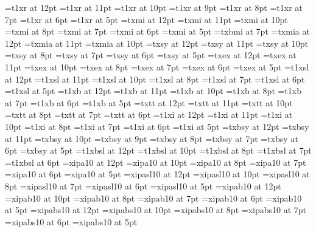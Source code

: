 \font\twelverm=t1xr at 12pt
\font\elevenrm=t1xr at 11pt
\font\tenrm=t1xr at 10pt
\font\ninerm=t1xr at 9pt
\font\eightrm=t1xr at 8pt
\font\sevenrm=t1xr at 7pt
\font\sixrm=t1xr at 6pt
\font\fiverm=t1xr at 5pt
\font\twelvei=txmi at 12pt
\font\eleveni=txmi at 11pt
\font\teni=txmi at 10pt
\font\eighti=txmi at 8pt
\font\seveni=txmi at 7pt
\font\sixi=txmi at 6pt
\font\fivei=txmi at 5pt
\font\sevenbi=txbmi at 7pt
\font\twelveia=txmia at 12pt
\font\elevenia=txmia at 11pt
\font\tenia=txmia at 10pt
\font\twelvesy=txsy at 12pt
\font\elevensy=txsy at 11pt
\font\tensy=txsy at 10pt
\font\eightsy=txsy at 8pt
\font\sevensy=txsy at 7pt
\font\sixsy=txsy at 6pt
\font\fivesy=txsy at 5pt
\font\twelveex=txex at 12pt
\font\elevenex=txex at 11pt
\font\tenex=txex at 10pt
\font\eightex=txex at 8pt
\font\sevenex=txex at 7pt
\font\sixex=txex at 6pt
\font\fiveex=txex at 5pt
\font\twelvesl=t1xsl at 12pt
\font\elevensl=t1xsl at 11pt
\font\tensl=t1xsl at 10pt
\font\eightsl=t1xsl at 8pt
\font\sevensl=t1xsl at 7pt
\font\sixsl=t1xsl at 6pt
\font\fivesl=t1xsl at 5pt
\font\twelvebf=t1xb at 12pt
\font\elevenbf=t1xb at 11pt
\font\tenbf=t1xb at 10pt
\font\eightbf=t1xb at 8pt
\font\sevenbf=t1xb at 7pt
\font\sixbf=t1xb at 6pt
\font\fivebf=t1xb at 5pt
\font\twelvett=txtt at 12pt
\font\eleventt=txtt at 11pt
\font\tentt=txtt at 10pt
\font\eighttt=txtt at 8pt
\font\seventt=txtt at 7pt
\font\sixtt=txtt at 6pt
\font\twelveit=t1xi at 12pt
\font\elevenit=t1xi at 11pt
\font\tenit=t1xi at 10pt
\font\eightit=t1xi at 8pt
\font\sevenit=t1xi at 7pt
\font\sixit=t1xi at 6pt
\font\fiveit=t1xi at 5pt
\font\twelvebsy=txbsy at 12pt
\font\elevensy=txbsy at 11pt
\font\tenbsy=txbsy at 10pt
\font\ninebsy=txbsy at 9pt
\font\eightbsy=txbsy at 8pt
\font\sevenbsy=txbsy at 7pt
\font\sixbsy=txbsy at 6pt
\font\fivebsy=txbsy at 5pt
\font\twelvebsl=t1xbsl at 12pt
\font\tenbsl=t1xbsl at 10pt
\font\eightbsl=t1xbsl at 8pt
\font\sevenbsl=t1xbsl at 7pt
\font\sixbsl=t1xbsl at 6pt
\font\twelveipr=xipa10 at 12pt
\font\tenipr=xipa10 at 10pt
\font\eightipr=xipa10 at 8pt
\font\sevenipr=xipa10 at 7pt
\font\sixipr=xipa10 at 6pt
\font\fiveipr=xipa10 at 5pt
\font\twelveips=xipasl10 at 12pt
\font\tenips=xipasl10 at 10pt
\font\eightips=xipasl10 at 8pt
\font\sevenips=xipasl10 at 7pt
\font\sixips=xipasl10 at 6pt
\font\fiveips=xipasl10 at 5pt
\font\twelveipb=xipab10 at 12pt
\font\tenipb=xipab10 at 10pt
\font\eightipb=xipab10 at 8pt
\font\sevenipb=xipab10 at 7pt
\font\sixipb=xipab10 at 6pt
\font\fiveipb=xipab10 at 5pt
\font\twelveipbs=xipabs10 at 12pt
\font\tenipbs=xipabs10 at 10pt
\font\eightipbs=xipabs10 at 8pt
\font\sevenipbs=xipabs10 at 7pt
\font\sixipbs=xipabs10 at 6pt
\font\fiveipbs=xipabs10 at 5pt

